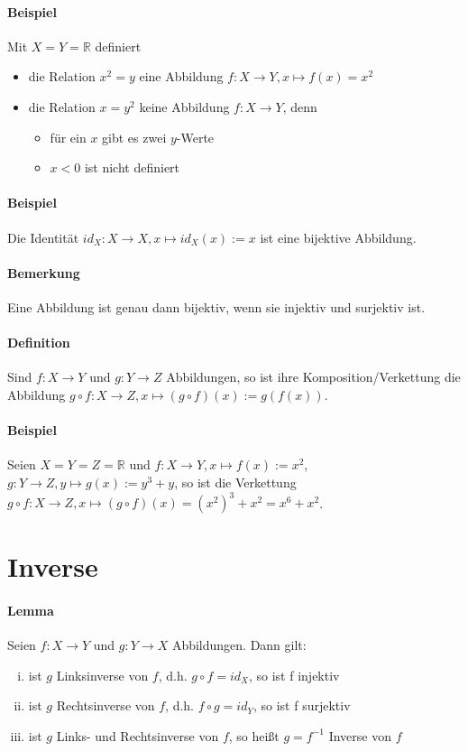 \documentclass[12pt,a4paper,parskip=half-,DIV=15]{scrreprt}
\begin{document}
\paragraph{Beispiel} Mit $X=Y=\mathbb{R}$ definiert
\begin{itemize}
\item die Relation $x^2 = y$ eine Abbildung $f:X\to Y, x\mapsto f(x)=x^2$
\item die Relation $x=y^2$ keine Abbildung $f:X\to Y$, denn
	\begin{itemize}
	\item für ein $x$ gibt es zwei $y$-Werte
	\item $x < 0$ ist nicht definiert
	\end{itemize}
\end{itemize}

\paragraph{Beispiel} Die Identität $id_X :X\to X, x\mapsto id_X(x):= x$ ist eine bijektive Abbildung.
\paragraph{Bemerkung} Eine Abbildung ist genau dann bijektiv, wenn sie injektiv und surjektiv ist.
\paragraph{Definition} Sind $ f:X\to Y $ und $ g:Y\to Z$ Abbildungen, so ist ihre Komposition/Verkettung die Abbildung $ g\circ f:X\to Z, x\mapsto (g\circ f)(x):= g(f(x)) $.
\paragraph{Beispiel} Seien $ X = Y = Z = \mathbb{R} $ und $ f:X\to Y, x\mapsto f(x) :=x^2 $, $ g:Y\to Z, y\mapsto g(x):=y^3 + y $, so ist die Verkettung $ g\circ f: X\to Z, x\mapsto (g\circ f)(x) = (x^2)^3+x^2 = x^6 + x^2 $.

\section{Inverse}
\paragraph{Lemma} Seien $ f:X\to Y $ und $ g:Y\to X $ Abbildungen. Dann gilt:
\begin{enumerate}[i)]
\item ist $ g $ Linksinverse von $ f $, d.h. $ g\circ f = id_X $, so ist f injektiv
\item ist $ g $ Rechtsinverse von $ f $, d.h. $ f\circ g = id_Y$, so ist f surjektiv
\item ist $ g $ Links- und Rechtsinverse von $ f $, so heißt $ g =f^{-1}$ Inverse von $ f $
\end{enumerate}
\end{document}
